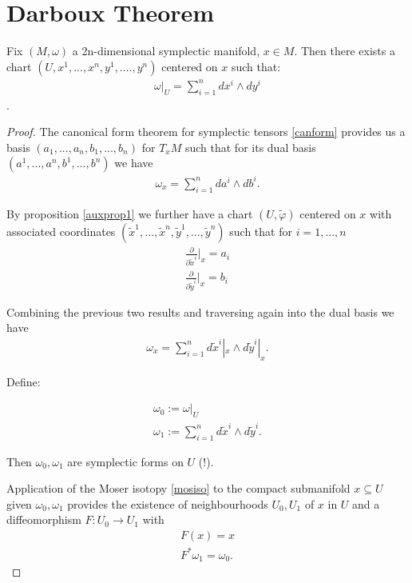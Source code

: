 \section{Darboux Theorem}

\begin{theorem}
Fix $(M , \omega)$ a 2n-dimensional symplectic manifold, $x \in M$. Then there exists a chart $(U, x^1, ... , x^n, y^1, .... , y^n)$ centered on $x$ such that:
\begin{align*}
\omega |_U = \sum^n_{i=1} dx^i \wedge dy^i
\end{align*}.
\end{theorem}

\begin{proof}
The canonical form theorem for symplectic tensors \ref{canform} provides us a basis $(a_1, ... , a_n, b_1, ... , b_n)$ for $T_x M$ such that for its dual basis $(a^1, ... , a^n, b^1, ... , b^n)$ we have
\begin{align*}
\omega_x = \sum^n_{i=1} da^i \wedge db^i.
\end{align*}

By proposition \ref{auxprop1} we further have a chart $(U, \tilde{\varphi})$ centered on $x$ with associated coordinates $({\tilde{x}}^1, ... , {\tilde{x}}^n ,{\tilde{y}}^1, ... , {\tilde{y}}^n)$ such that for $i = 1,..., n$
\begin{align*}
\frac{\partial}{\partial \tilde{x}^i} \bigg\vert_x = a_i  \\
\frac{\partial}{\partial \tilde{y}^i} \bigg\vert_x = b_i 
\end{align*}

Combining the previous two results and traversing again into the dual basis we have
\begin{align*}
\omega_x = \sum^n_{i=1} d\tilde{x}^i|_x \wedge d\tilde{y}^i|_x.
\end{align*}

Define:

\begin{align*}
\omega_0 := \omega|_U \\
\omega_1 := \sum^n_{i=1} d\tilde{x}^i \wedge d\tilde{y}^i.
\end{align*}

Then $\omega_0 , \omega_1$ are symplectic forms on $U$ (!). 

Application of the Moser isotopy \ref{mosiso} to the compact submanifold ${x} \subseteq U$ given $\omega_0, \omega_1$ provides the existence of neighbourhoods $U_0, U_1$ of $x$ in $U$ and a diffeomorphism $F: U_0 \to U_1$ with
\begin{align*}
F(x) = x \\
F^* \omega_1 = \omega_0.
\end{align*}


\end{proof}
